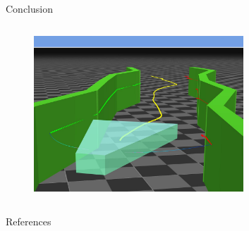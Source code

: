 \documentclass[AIRbeamer
,optEnglish
,optBiber
,optBibstyleAlphabetic
,optBeamerClassicFormat%
]{AIRlatex}
\begin{document}
\begin{frame}{Conclusion}
\begin{columns}[T,onlytextwidth]
\begin{column}[T]{0.4\textwidth}
\begin{figure}[H]
                \end{figure}
                \vskip-0.5cm
                \begin{figure}[H]
                    \centering
                    \includegraphics[width=0.7\textwidth]{figures/platform-in-tunnel}
                \end{figure}
            \end{column}
        \end{columns}
    \end{frame}


    \begin{frame}[allowframebreaks]{References}
        \printbibliography[heading=none]
    \end{frame}%

    \AIRbeamerTitlePageStudentThesis%
\end{document}
